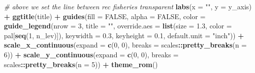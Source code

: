 \documentclass[]{article}
\newenvironment{Shaded}{\begin{snugshade}}{\end{snugshade}}
\newcommand{\KeywordTok}[1]{\textcolor[rgb]{0.13,0.29,0.53}{\textbf{#1}}}
\newcommand{\DataTypeTok}[1]{\textcolor[rgb]{0.13,0.29,0.53}{#1}}
\newcommand{\DecValTok}[1]{\textcolor[rgb]{0.00,0.00,0.81}{#1}}
\newcommand{\FloatTok}[1]{\textcolor[rgb]{0.00,0.00,0.81}{#1}}
\newcommand{\StringTok}[1]{\textcolor[rgb]{0.31,0.60,0.02}{#1}}
\newcommand{\CommentTok}[1]{\textcolor[rgb]{0.56,0.35,0.01}{\textit{#1}}}
\newcommand{\OtherTok}[1]{\textcolor[rgb]{0.56,0.35,0.01}{#1}}
\newcommand{\OperatorTok}[1]{\textcolor[rgb]{0.81,0.36,0.00}{\textbf{#1}}}
\newcommand{\NormalTok}[1]{#1}
\begin{document}
\begin{Shaded}
\begin{Highlighting}[]
\StringTok{  }\CommentTok{# above we set the line between rec fisheries transparent}
\StringTok{  }\KeywordTok{labs}\NormalTok{(}\DataTypeTok{x =} \StringTok{""}\NormalTok{, }\DataTypeTok{y =}\NormalTok{ y_axis) }\OperatorTok{+}
\StringTok{  }\KeywordTok{ggtitle}\NormalTok{(title) }\OperatorTok{+}
\StringTok{  }\KeywordTok{guides}\NormalTok{(}\DataTypeTok{fill  =} \OtherTok{FALSE}\NormalTok{,}
         \DataTypeTok{alpha =} \OtherTok{FALSE}\NormalTok{,}
         \DataTypeTok{color =} \KeywordTok{guide_legend}\NormalTok{(}\DataTypeTok{nrow =} \DecValTok{3}\NormalTok{, }
                              \DataTypeTok{title =} \StringTok{""}\NormalTok{,}
                              \DataTypeTok{override.aes =} \KeywordTok{list}\NormalTok{(}\DataTypeTok{size =} \FloatTok{1.3}\NormalTok{, }
                                                  \DataTypeTok{color =}\NormalTok{ pal[}\KeywordTok{seq}\NormalTok{(}\DecValTok{1}\NormalTok{, n_lev)]),}
                              \DataTypeTok{keywidth =} \FloatTok{0.3}\NormalTok{,}
                              \DataTypeTok{keyheight =} \FloatTok{0.1}\NormalTok{,}
                              \DataTypeTok{default.unit =} \StringTok{"inch"}\NormalTok{)) }\OperatorTok{+}
\StringTok{  }\KeywordTok{scale_x_continuous}\NormalTok{(}\DataTypeTok{expand =} \KeywordTok{c}\NormalTok{(}\DecValTok{0}\NormalTok{, }\DecValTok{0}\NormalTok{), }\DataTypeTok{breaks =}\NormalTok{ scales}\OperatorTok{::}\KeywordTok{pretty_breaks}\NormalTok{(}\DataTypeTok{n =} \DecValTok{6}\NormalTok{)) }\OperatorTok{+}
\StringTok{  }\KeywordTok{scale_y_continuous}\NormalTok{(}\DataTypeTok{expand =} \KeywordTok{c}\NormalTok{(}\DecValTok{0}\NormalTok{, }\DecValTok{0}\NormalTok{), }\DataTypeTok{breaks =}\NormalTok{ scales}\OperatorTok{::}\KeywordTok{pretty_breaks}\NormalTok{(}\DataTypeTok{n =} \DecValTok{5}\NormalTok{)) }\OperatorTok{+}
\StringTok{  }\KeywordTok{theme_rom}\NormalTok{()}
\end{Highlighting}
\end{Shaded}
\end{document}
